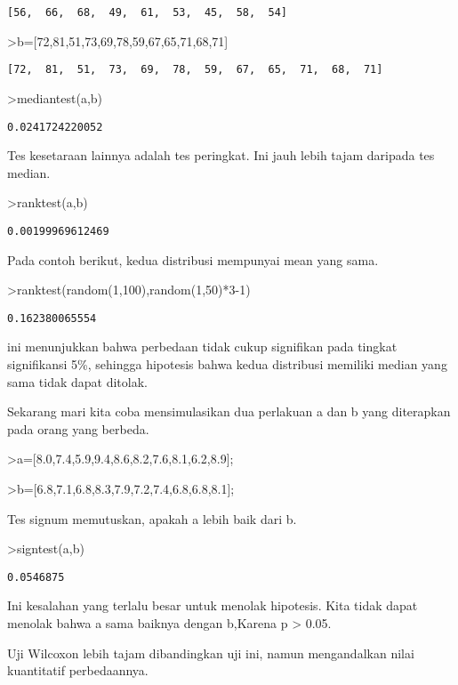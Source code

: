\documentclass[
]{book}
\begin{document}
\begin{verbatim}
[56,  66,  68,  49,  61,  53,  45,  58,  54]
\end{verbatim}

\textgreater b={[}72,81,51,73,69,78,59,67,65,71,68,71{]}

\begin{verbatim}
[72,  81,  51,  73,  69,  78,  59,  67,  65,  71,  68,  71]
\end{verbatim}

\textgreater mediantest(a,b)

\begin{verbatim}
0.0241724220052
\end{verbatim}

Tes kesetaraan lainnya adalah tes peringkat. Ini jauh lebih tajam daripada tes median.

\textgreater ranktest(a,b)

\begin{verbatim}
0.00199969612469
\end{verbatim}

Pada contoh berikut, kedua distribusi mempunyai mean yang sama.

\textgreater ranktest(random(1,100),random(1,50)*3-1)

\begin{verbatim}
0.162380065554
\end{verbatim}

ini menunjukkan bahwa perbedaan tidak cukup signifikan pada tingkat signifikansi 5\%, sehingga hipotesis bahwa kedua distribusi memiliki median yang sama tidak dapat ditolak.

Sekarang mari kita coba mensimulasikan dua perlakuan a dan b yang diterapkan pada orang yang berbeda.

\textgreater a={[}8.0,7.4,5.9,9.4,8.6,8.2,7.6,8.1,6.2,8.9{]};

\textgreater b={[}6.8,7.1,6.8,8.3,7.9,7.2,7.4,6.8,6.8,8.1{]};

Tes signum memutuskan, apakah a lebih baik dari b.

\textgreater signtest(a,b)

\begin{verbatim}
0.0546875
\end{verbatim}

Ini kesalahan yang terlalu besar untuk menolak hipotesis. Kita tidak dapat menolak bahwa a sama baiknya dengan b,Karena p \textgreater{} 0.05.

Uji Wilcoxon lebih tajam dibandingkan uji ini, namun mengandalkan nilai kuantitatif perbedaannya.
\end{document}
